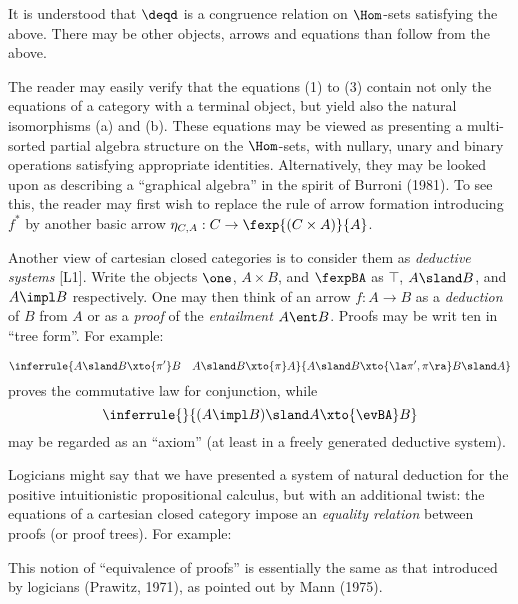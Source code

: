 \begin{defn}
\end{defn}
\noindent
It is understood that $\deqd$ is a congruence relation%
on $\Hom$-sets satisfying the
above. There may be other objects, arrows and equations than follow from the
above.

The reader may easily verify that the equations (1) to (3) contain not
only the equations of a category with a terminal object, but yield also the
natural isomorphisms (a) and (b). These equations may be viewed as presenting
a multi-sorted partial algebra structure on the $\Hom$-sets, with nullary, unary
and binary operations satisfying appropriate identities. Alternatively, they
may be looked upon as describing a ``graphical algebra'' in the spirit of
Burroni (1981). To see this, the reader may first wish to replace the rule of
arrow formation introducing $f^*$ by another basic arrow 
$\eta_{C,A}: C \to \fexp{(C \times A)}{A}$.

Another view of cartesian closed categories is to consider them as
{\em deductive systems} [L1]. Write the objects $\one$, $A \times B$, and $\fexpBA$
as $\top$, $A \sland B$, and $A \impl B$ respectively. One may then think of an arrow
$f: A \to B$ as a {\em deduction} of $B$ from $A$ or as a {\em proof}
of the {\em entailment} $A \ent B$. Proofs may
be writ ten in ``tree form''. For example:

\[
\inferrule {A \sland B \xto{\pi'} B \quad A \sland B \xto{\pi} A}{A \sland B \xto{\la \pi', \pi \ra}  B \sland A}
\]
proves the commutative law for conjunction, while
\[
\inferrule{ }{(A \impl B) \sland A \xto{\evBA} B}
\]
may be regarded as an ``axiom'' (at least in a freely generated deductive system).

Logicians might say that we have presented a system of natural deduction
for the positive intuitionistic propositional calculus, but with an additional
twist: the equations of a cartesian closed category impose an {\em equality
relation} between proofs (or proof trees). For example:
\def\extraVskip{3pt}
\begin{prooftree}
\end{prooftree}

This notion of ``equivalence of proofs'' is essentially the same as that
introduced by logicians (Prawitz, 1971), as pointed out by Mann (1975).

